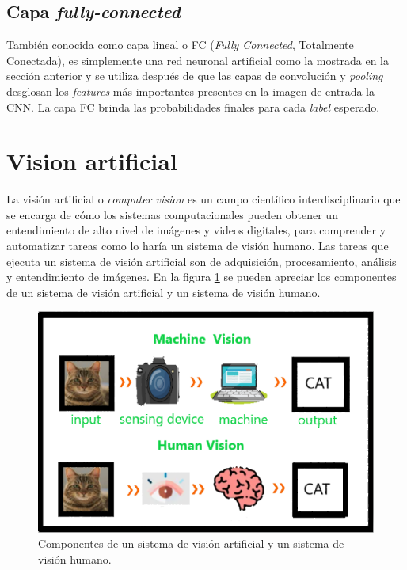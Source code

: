 \subsection{Capa \textit{fully-connected}}
También conocida como capa lineal o FC (\textit{Fully Connected}, Totalmente Conectada), es simplemente una red neuronal artificial como la
mostrada en la sección anterior y se utiliza después de que las capas de convolución y \textit{pooling} desglosan los \textit{features} más importantes presentes en la imagen de entrada  la CNN. La capa FC brinda las probabilidades finales para cada \textit{label} esperado.

\section{Vision artificial}
La visión artificial o \textit{computer vision} es un campo científico interdisciplinario que se encarga de cómo los sistemas computacionales pueden obtener un entendimiento de alto nivel de imágenes y videos digitales, para comprender y automatizar tareas como lo haría un sistema de visión humano. Las tareas que ejecuta un sistema de visión artificial son de adquisición, procesamiento, análisis y entendimiento de imágenes. En la figura \ref{fig:mv_comp} se pueden apreciar los componentes de un sistema de visión artificial y un sistema de visión humano.

\begin{figure}[h]
	\centering
	\includegraphics[scale=0.3]{./Figures/mv_comp.png}
	\caption{Componentes de un sistema de visión artificial y un sistema de visión humano.}
	\label{fig:mv_comp}
\end{figure}

